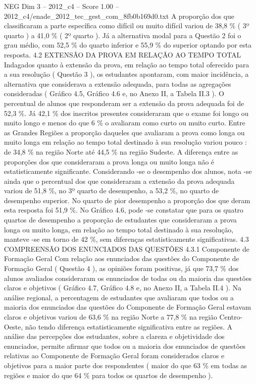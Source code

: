 \begin{textsample}{NEG Dim 3 – 2012\_c4 – Score 1.00 – 2012\_c4/enade\_2012\_tec\_gest\_com\_8fb0b169d0.txt}
A proporção dos que classificaram a parte específica como difícil ou muito difícil variou de 38,8 \% ( 3º quarto ) a 41,0 \% ( 2º quarto ).
Já a alternativa modal para a Questão 2 foi o grau médio, com 52,5 \% do quarto inferior e 55,9 \% do superior optando por esta resposta. 4.2 EXTENSÃO DA PROVA EM RELAÇÃO AO TEMPO TOTAL Indagados quanto à extensão da prova, em relação ao tempo total oferecido para a sua resolução ( Questão 3 ), os estudantes apontaram, com maior incidência, a alternativa que considerava a extensão adequada, para todas as agregações consideradas ( Gráfico 4.5, Gráfico 4.6 e, no Anexo II, a Tabela II.3 ).
O percentual de alunos que responderam ser a extensão da prova adequada foi de 52,3 \%.
Já 42,1 \% dos inscritos presentes consideraram que o exame foi longo ou muito longo e menos do que 6 \% o avaliaram como curto ou muito curto.
Entre as Grandes Regiões a proporção daqueles que avaliaram a prova como longa ou muito longa em relação ao tempo total destinado à sua resolução variou pouco : de 34,8 \% na região Norte até 44,5 \% na região Sudeste.
A diferença entre as proporções dos que consideraram a prova longa ou muito longa não é estatisticamente significante.
Considerando -se o desempenho dos alunos, nota -se ainda que o percentual dos que consideraram a extensão da prova adequada variou de 51,8 \%, no 3º quarto de desempenho, a 53,2 \%, no quarto de desempenho superior.
No quarto de pior desempenho a proporção dos que deram esta resposta foi 51,9 \%.
No Gráfico 4.6, pode -se constatar que para os quatro quartos de desempenho a proporção de estudantes que consideraram a prova longa ou muito longa, em relação ao tempo total destinado à sua resolução, manteve -se em torno de 42 \%, sem diferenças estatisticamente significativas. 4.3 COMPREENSÃO DOS ENUNCIADOS DAS QUESTÕES 4.3.1 Componente de Formação Geral Com relação aos enunciados das questões do Componente de Formação Geral ( Questão 4 ), as opiniões foram positivas, já que 73,7 \% dos alunos avaliados consideraram os enunciados de todas ou da maioria das questões claros e objetivos ( Gráfico 4.7, Gráfico 4.8 e, no Anexo II, a Tabela II.4 ).
Na análise regional, a percentagem de estudantes que avaliaram que todos ou a maioria dos enunciados das questões do Componente de Formação Geral estavam claros e objetivos variou de 63,6 \% na região Norte a 77,8 \% na região Centro-Oeste, não tendo diferença estatisticamente significativa entre as regiões.
A análise das percepções dos estudantes, sobre a clareza e objetividade dos enunciados, permite afirmar que todos ou a maioria dos enunciados de questões relativas ao Componente de Formação Geral foram considerados claros e objetivos para a maior parte dos respondentes ( maior do que 63 \% em todas as regiões e maior do que 64 \% para todos os quartos de desempenho ).

\end{textsample}
